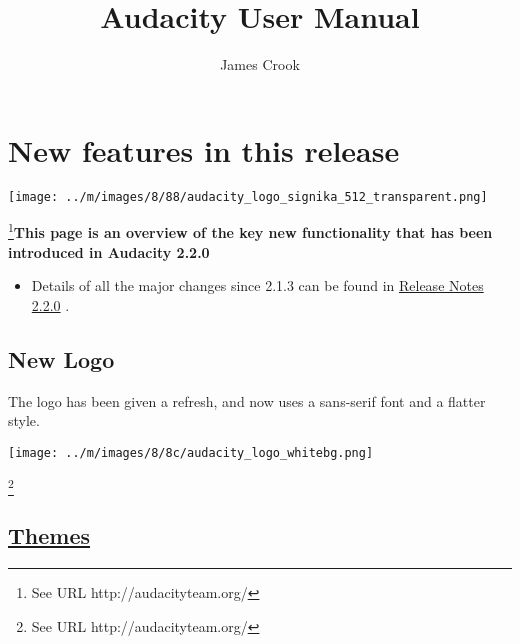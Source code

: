 \documentclass[]{book}
\begin{document}
{\let\cleardoublepage\clearpage 
\title{Audacity User Manual}
\author{James Crook}
}


																					
\chapter{New features in this release}

\label{f0}\begin{multicols}{2}																																						

\par\texttt{[image: ../m/images/8/88/audacity\_logo\_signika\_512\_transparent.png]}\par\footnote{See URL http://audacityteam.org/}\newline\textbf{This page is an overview of the key new functionality that has been introduced in Audacity 2.2.0}
\begin{itemize}
\item  Details of all the major changes since 2.1.3 can be found in 
\hyperref[https:__wiki.audacityteam.org_wiki_Release_Notes_2.2.0]{Release Notes 2.2.0}
.
\end{itemize}





\section{New Logo}


The logo has been given a refresh, and now uses a sans-serif font and a flatter style.

\par\texttt{[image: ../m/images/8/8c/audacity\_logo\_whitebg.png]}\par\footnote{See URL http://audacityteam.org/}


\section{
\hyperref[themes_]{Themes}
}



\end{multicols}
\end{document}
